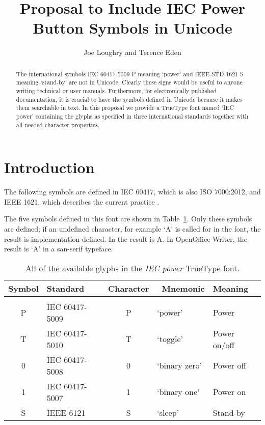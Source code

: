 \documentclass[10pt,letterpaper]{article}
\newcommand{\IEC}[1]{{\fontspec{IEC power}#1}}
\begin{document}
\title{Proposal to Include IEC Power Button Symbols in Unicode}

\author{Joe Loughry and Terence Eden}

\maketitle

\begin{abstract}
The international symbols IEC 60417-5009 \IEC{P} meaning `power' and
IEEE-STD-1621 \IEC{S} meaning `stand-by' are not in Unicode.  Clearly
these signs would be useful to anyone writing technical or user manuals.
Furthermore, for electronically published documentation, it is crucial
to have the symbols defined in Unicode because it makes them searchable
in text.  In this proposal we provide a TrueType font named `IEC power'
containing the glyphs as specified in three international standards
together with all needed character properties.
\end{abstract}

\section{Introduction}

The following symbols are defined in IEC 60417, which is also ISO 7000:2012,
and IEEE 1621, which describes the current practice
\cite{IEEE1621,ISO7000,IEC60417}.

The five symbols defined in this font are shown in Table~\ref{table:symbols}.
Only these symbols are defined; if an undefined character, for example `A' is
called for in the font, the result is implementation-defined. In 
the result is \IEC{A}. In OpenOffice Writer, the result is `A' in a san-serif
typeface.

\begin{table}[htbp]
	\centering
	\begin{tabular}{clcll}
		\textbf{Symbol} & \textbf{Standard} & \textbf{Character} & \
			\textbf{Mnemonic} & \textbf{Meaning} \\
		\hline \\
		\IEC{P} & IEC 60417-5009 & P & `power'       & Power        \\
		\IEC{T} & IEC 60417-5010 & T & `toggle'      & Power on/off \\
		\IEC{0} & IEC 60417-5008 & 0 & `binary zero' & Power off    \\
		\IEC{1} & IEC 60417-5007 & 1 & `binary one'  & Power on     \\
		\IEC{S} & IEEE 6121      & S & `sleep'       & Stand-by     \\
    \end{tabular}
    \caption{All of the available glyphs in the \emph{IEC power} TrueType font.}
    \label{table:symbols} %
\end{table}
\end{document}
